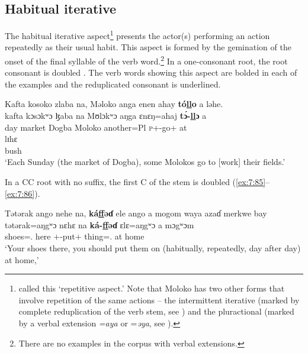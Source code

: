 \largerpage
\subsection{Habitual iterative}\label{sec:7.4.4}
\hypertarget{RefHeading1212281525720847}{}
The habitual iterative aspect\footnote{\citet{FriesenMamalis2008} called this ‘repetitive aspect.’ Note that Moloko has two other forms that involve repetition of the same actions -- the intermittent iterative (marked by complete reduplication of the verb stem, see ) and the pluractional (marked by a verbal extension\textit{ =aya }or =\textit{əya}, see ).} presents the actor(s) performing an action repeatedly as their usual habit. This aspect is formed by the gemination of the onset of the final syllable of the verb word.\footnote{There are no examples in the corpus with verbal extensions.} In a one-consonant root, the root consonant is doubled . The verb words showing this aspect are bolded in each of the examples and the reduplicated consonant is underlined. 

\ea\label{ex:7:84}
Kafta  kosoko  zlaba  na,  Məloko  anga  enen  ahay  \textbf{tó\underline{ll}o}  a  ləhe.\\
\gll  kafta kɔsɔkʷɔ  ɮaba  na  Mʊlɔkʷɔ  aŋga  ɛnɛŋ=ahaj  \textbf{t\'ɔ-\underline{ll}ɔ}    a \\ 
      day    market  Dogba  {\PSP}  Moloko  {\POSS}  another=Pl  \textsc{p}+{\IFV}-go+{\ITR}  at \\ 
      
      \medskip
\gll lɪhɛ\\
     bush\\
\glt  ‘Each Sunday (the market of Dogba), some Molokos go to [work] their fields.’\\
\z 

In a CC root with no suffix, the first C of the stem is doubled (\ref{ex:7:85}--\ref{ex:7:86}).

\ea\label{ex:7:85}
Tətərak  ango  nehe  na,  \textbf{ká\underline{ff}əɗ}  ele  ango  a  mogom waya  azaɗ  merkwe  bay\\
\gll  tətərak=aŋgʷɔ nɛhɛ na \textbf{ká-\underline{ff}əɗ} ɛlɛ=aŋgʷɔ a mɔgʷɔm \\ 
      shoes={\twoS}.{\POSS} here   {\PSP}  {\twoS}+{\IFV}-put+{\ITR}  thing={\twoS}.{\POSS}     at   home\\  
\glt ‘Your shoes there, you should put them on (habitually, repeatedly, day after day) at home,’\\      
      
